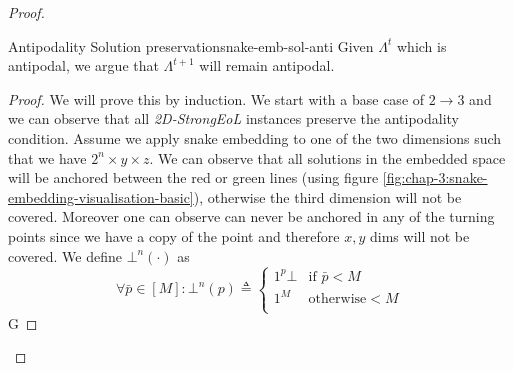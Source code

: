 \begin{proof}
    \begin{claimbox}{Antipodality Solution preservation}{snake-emb-sol-anti}
        Given $\Lambda^t$ which is antipodal, we argue that $\Lambda^{t+1}$
        will remain antipodal.
    \end{claimbox}

    \begin{proof}
        We will prove this by induction. We start with a base case of $2 \to 3$
        and we can observe that all \textit{2D-StrongEoL} instances preserve the antipodality condition.
        Assume we apply snake embedding to one of the two dimensions such that we have $2^n \times y \times z$.
        We can observe that all solutions in the embedded space will be anchored between the red or green lines
        (using figure
        \ref{fig:chap-3:snake-embedding-visualisation-basic}), otherwise the third dimension will not be covered.
        Moreover one can observe can never be anchored in any of the turning points since we have a copy of
        the point and therefore $x,y$ dims will not be covered. We define $\bot^n(\cdot)$ as
        $$ %
            \forall \bar{p} \in [M]: \bot^n(p) \triangleq \begin{cases}
                1^p\bot & \text{if } \bar{p} < M \\
                1^M     & \text{otherwise} < M   \\
            \end{cases}
        $$
        G

    \end{proof}




\end{proof}
